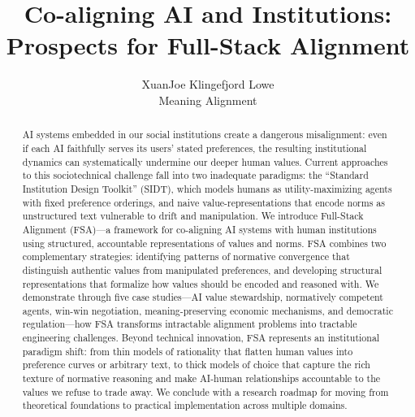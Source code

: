 \documentclass[numbers]{article}
\title{Co-aligning AI and Institutions: Prospects for Full-Stack Alignment}
\author{
  XuanJoe Klingefjord Lowe\\
  Meaning Alignment\\
}
\begin{document}
\maketitle

\begin{abstract}
AI systems embedded in our social institutions create a dangerous misalignment: even if each AI faithfully serves its users' stated preferences, the resulting institutional dynamics can systematically undermine our deeper human values. Current approaches to this sociotechnical challenge fall into two inadequate paradigms: the ``Standard Institution Design Toolkit'' (SIDT), which models humans as utility-maximizing agents with fixed preference orderings, and naive value-representations that encode norms as unstructured text vulnerable to drift and manipulation. We introduce Full-Stack Alignment (FSA)—a framework for co-aligning AI systems with human institutions using structured, accountable representations of values and norms. FSA combines two complementary strategies: identifying patterns of normative convergence that distinguish authentic values from manipulated preferences, and developing structural representations that formalize how values should be encoded and reasoned with. We demonstrate through five case studies—AI value stewardship, normatively competent agents, win-win negotiation, meaning-preserving economic mechanisms, and democratic regulation—how FSA transforms intractable alignment problems into tractable engineering challenges. Beyond technical innovation, FSA represents an institutional paradigm shift: from thin models of rationality that flatten human values into preference curves or arbitrary text, to thick models of choice that capture the rich texture of normative reasoning and make AI-human relationships accountable to the values we refuse to trade away. We conclude with a research roadmap for moving from theoretical foundations to practical implementation across multiple domains.
\end{abstract}









\renewcommand{\bibsection}{\section*{References}}
\setlength{\bibsep}{0.0pt}


\end{document}
